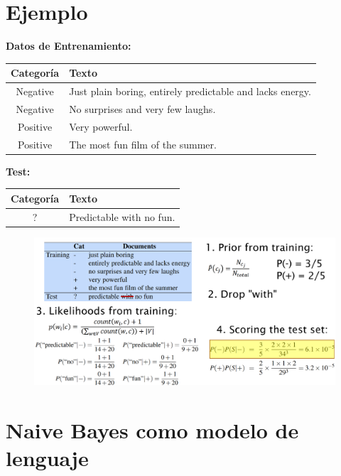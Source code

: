 \documentclass[11pt,fleqn]{book} %
\begin{document}
\section{Ejemplo}

\textbf{Datos de Entrenamiento:} 

\begin{table}[h]
\centering
\begin{tabular}{|c|p{}|}
\hline
\textbf{Categoría} & \textbf{Texto} \\
\hline
Negative & Just plain boring, entirely predictable and lacks energy. \\
\hline
Negative & No surprises and very few laughs. \\
\hline
Positive & Very powerful. \\
\hline
Positive & The most fun film of the summer. \\
\hline
\end{tabular}
\end{table}


\textbf{Test:} 
\begin{table}[h]
\centering
\begin{tabular}{|c|p{}|}
\hline
\textbf{Categoría} & \textbf{Texto} \\
\hline
? & Predictable with no fun. \\
\hline
\end{tabular}
\end{table}

\begin{figure}[h]
\includegraphics[scale = 0.23]{pics/naive_example.png}
\end{figure}

\section{Naive Bayes como modelo de lenguaje}
\end{document}

